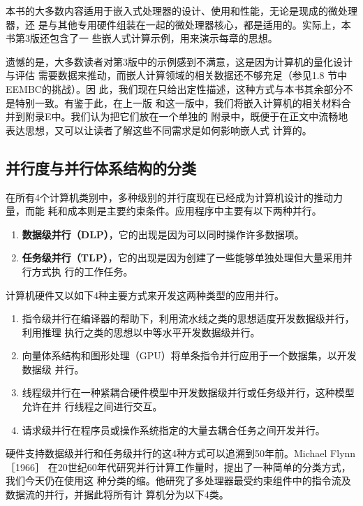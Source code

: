本书的大多数内容适用于嵌入式处理器的设计、使用和性能，无论是现成的微处理器，还
是与其他专用硬件组装在一起的微处理器核心，都是适用的。实际上，本书第3版还包含了一
些嵌人式计算示例，用来演示每章的思想。

遗憾的是，大多数读者对第3版中的示例感到不满意，这是因为计算机的量化设计与评估
需要数据来推动，而嵌人计算领域的相关数据还不够充足（参见1.8 节中EEMBC的挑战）。因
此，我们现在只给出定性描述，这种方式与本书其余部分不是特别一致。有鉴于此，在上一版
和这一版中，我们将嵌入计算机的相关材料合并到附录E中。我们认为把它们放在一个单独的
附录中，既便于在正文中流畅地表达思想，又可以让读者了解这些不同需求是如何影响嵌人式
计算的。

\subsection{并行度与并行体系结构的分类}
在所有4个计算机类别中，多种级别的并行度现在已经成为计算机设计的推动力量，而能
耗和成本则是主要约束条件。应用程序中主要有以下两种并行。

\begin{enumerate}
    \item \textbf{数据级并行（DLP）}，它的出现是因为可以同时操作许多数据项。
    \item \textbf{任务级并行（TLP）}，它的出现是因为创建了一些能够单独处理但大量采用并行方式执
    行的工作任务。
\end{enumerate}

计算机硬件又以如下4种主要方式来开发这两种类型的应用并行。

\begin{enumerate}
    \item 指令级并行在编译器的帮助下，利用流水线之类的思想适度开发数据级并行，利用推理
    执行之类的思想以中等水平开发数据级并行。
    \item 向量体系结构和图形处理（GPU）将单条指令并行应用于一个数据集，以开发数据级
    并行。
    \item 线程级并行在一种紧耦合硬件模型中开发数据级并行或任务级并行，这种模型允许在并
    行线程之间进行交互。
    \item 请求级并行在程序员或操作系统指定的大量去耦合任务之间开发并行。
\end{enumerate}

硬件支持数据级并行和任务级并行的这4种方式可以追溯到50年前。Michael Flynn ［1966］
在20世纪60年代研究并行计算工作量时，提出了一种简单的分类方式，我们今天仍在使用这
种分类的缩。他研究了多处理器最受约束组件中的指令流及数据流的并行，并据此将所有计
算机分为以下4类。

